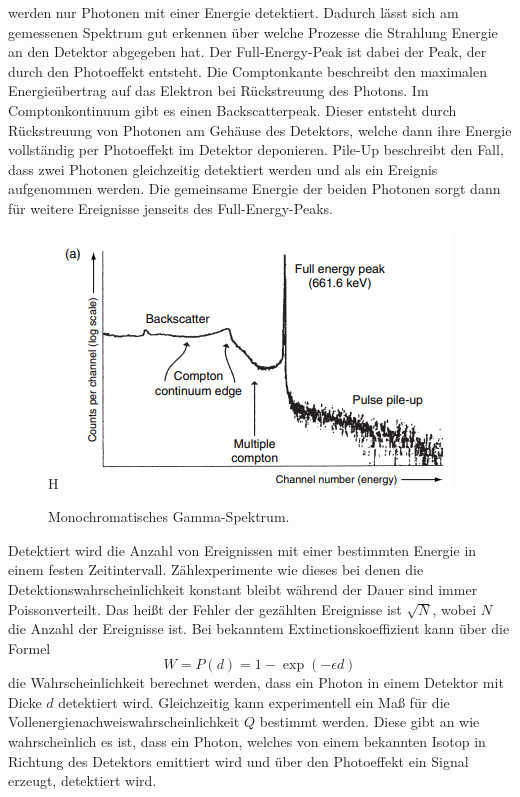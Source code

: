 werden nur Photonen mit einer Energie detektiert. Dadurch lässt sich am gemessenen Spektrum gut erkennen über welche Prozesse die Strahlung Energie
an den Detektor abgegeben hat. Der Full-Energy-Peak ist dabei der Peak, der durch den Photoeffekt entsteht. Die Comptonkante beschreibt 
den maximalen Energieübertrag auf das Elektron bei Rückstreuung des Photons. Im Comptonkontinuum gibt es einen Backscatterpeak. Dieser entsteht 
durch Rückstreuung von Photonen am Gehäuse des Detektors, welche dann ihre Energie vollständig per Photoeffekt im Detektor deponieren.
Pile-Up beschreibt den Fall, dass zwei Photonen gleichzeitig detektiert werden und als ein Ereignis aufgenommen werden. Die gemeinsame Energie der beiden Photonen sorgt dann für weitere Ereignisse 
jenseits des Full-Energy-Peaks.
\begin{figure}{H}
    \centering
    \includegraphics[scale=1.0]{illustration/MonoSpektrum.png}
    \caption{Monochromatisches Gamma-Spektrum.\cite{GammaRay}}
    \label{fig:Mono}
\end{figure}
\noindent Detektiert wird die Anzahl von Ereignissen mit einer bestimmten Energie in einem festen Zeitintervall. Zählexperimente wie dieses
bei denen die Detektionswahrscheinlichkeit konstant bleibt während der Dauer sind immer Poissonverteilt.
Das heißt der Fehler der gezählten Ereignisse ist $\sqrt{N}$, wobei $N$ die Anzahl der Ereignisse ist. 
Bei bekanntem Extinctionskoeffizient kann über die Formel 
\begin{equation}
    \label{eq:Extinktion}
    W=P(d) = 1-\exp(-\epsilon d)
\end{equation}
die Wahrscheinlichkeit berechnet werden, dass ein Photon in einem Detektor mit Dicke $d$ detektiert wird.
Gleichzeitig kann experimentell ein Maß für die Vollenergienachweiswahrscheinlichkeit $Q$ bestimmt werden. Diese gibt an wie wahrscheinlich es ist, dass ein Photon, 
welches von einem bekannten Isotop in Richtung des Detektors emittiert wird und über den Photoeffekt ein Signal erzeugt, detektiert wird.
